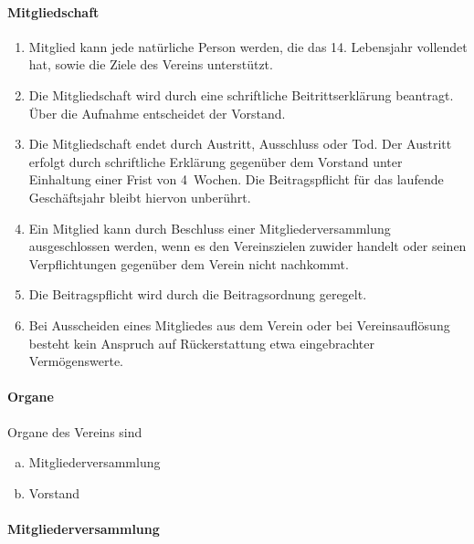 \documentclass[12pt]{satzung}
\begin{document}
\paragraph{Mitgliedschaft}
\label{sec:mitgliedschaft}

\begin{enumerate}[(1)]
    \item Mitglied kann jede natürliche Person werden, die das 14. Lebensjahr vollendet hat, sowie die Ziele des Vereins unterstützt.
    \item Die Mitgliedschaft wird durch eine schriftliche Beitrittserklärung beantragt. Über die Aufnahme entscheidet der Vorstand.
    \item Die Mitgliedschaft endet durch Austritt, Ausschluss oder Tod. Der Austritt erfolgt durch schriftliche Erklärung gegenüber dem Vorstand unter Einhaltung einer Frist von 4~Wochen. Die Beitragspflicht für das laufende Geschäftsjahr bleibt hiervon unberührt.
    \item Ein Mitglied kann durch Beschluss einer Mitgliederversammlung ausgeschlossen werden, wenn es den Vereinszielen zuwider handelt oder seinen Verpflichtungen gegenüber dem Verein nicht nachkommt.
    \item Die Beitragspflicht wird durch die Beitragsordnung geregelt.
    \item Bei Ausscheiden eines Mitgliedes aus dem Verein oder bei Vereinsauflösung besteht kein Anspruch auf Rückerstattung etwa eingebrachter Vermögenswerte. 

\end{enumerate}

\paragraph{Organe}
\label{sec:organe}

Organe des Vereins sind
\begin{enumerate}[a)]
    \item Mitgliederversammlung
    \item Vorstand 
\end{enumerate}

\paragraph{Mitgliederversammlung}
\label{sec:mitgliederversammlung}
\end{document}
